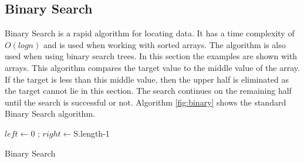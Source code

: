\documentclass[10pt,twocolumn,hidelinks]{IEEEtran}
\begin{document}
\subsection{Binary Search}
Binary Search is a rapid algorithm for locating data. It has a time complexity of $O(log{n})$ and is used when working with sorted arrays. The algorithm is also used when using binary search trees. In this section the examples are shown with arrays. This algorithm compares the target value to the middle value of the array. If the target is less than this middle value, then the upper half is eliminated as the target cannot lie in this section. The search continues on the remaining half until the search is successful or not. Algorithm \ref{fig:binary} shows the standard Binary Search algorithm.
\IncMargin{1em}
\begin{algorithm}[h]
\LinesNumbered
	
	$left \longleftarrow $0 ; $right \longleftarrow $S.length-1\\
\caption{Binary Search}
\label{fig:binary}
\end{algorithm}\DecMargin{1em}
\end{document}
